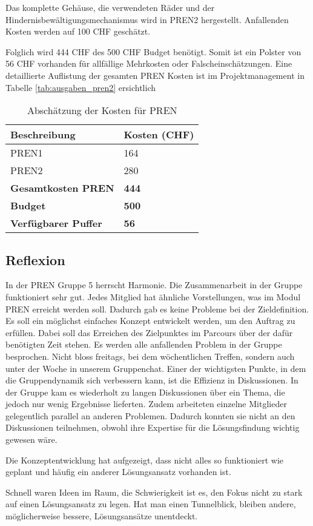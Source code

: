 \documentclass[../main.tex]{subfiles}
\begin{document}
Das komplette Gehäuse, die verwendeten Räder und der Hindernisbewältigungsmechanismus wird in PREN2 hergestellt. Anfallenden Kosten werden auf 100 CHF geschätzt.

Folglich wird 444 CHF des 500 CHF Budget benötigt. Somit ist ein Polster von 56 CHF vorhanden für allfällige Mehrkosten oder Falscheinschätzungen. Eine detaillierte Auflistung der gesamten PREN Kosten ist im Projektmanagement in Tabelle \ref{tab:ausgaben_pren2} ersichtlich

\begin{table}[h!]
    \centering
    \begin{tabular}{|p{5cm}|p{3cm}|}
        \hline
        \textbf{Beschreibung} & \textbf{Kosten (CHF)} \\
        \hline
        PREN1 & 164 \\
        \hline
        PREN2 & 280 \\
        \hline
        \textbf{Gesamtkosten PREN} & \textbf{444} \\
        \hline
        \textbf{Budget} & \textbf{500} \\
        \hline
        \textbf{Verfügbarer Puffer} & \textbf{56} \\
        \hline
    \end{tabular}
    \caption{Abschätzung der Kosten für PREN}
    \label{tab:kostenuebersicht}
\end{table}

\subsection{Reflexion}

In der PREN Gruppe 5 herrscht Harmonie.
\newline
\newline
Die Zusammenarbeit in der Gruppe funktioniert sehr gut. Jedes Mitglied hat ähnliche Vorstellungen, was im Modul PREN erreicht werden soll. Dadurch gab es keine Probleme bei der Zieldefinition. Es soll ein möglichst einfaches Konzept entwickelt werden, um den Auftrag zu erfüllen. Dabei soll das Erreichen des Zielpunktes im Parcours über der dafür benötigten Zeit stehen. Es werden alle anfallenden Problem in der Gruppe besprochen. Nicht bloss freitags, bei dem wöchentlichen Treffen, sondern auch unter der Woche in unserem Gruppenchat. Einer der wichtigsten Punkte, in dem die Gruppendynamik sich verbessern kann, ist die Effizienz in Diskussionen. In der Gruppe kam es wiederholt zu langen Diskussionen über ein Thema, die jedoch nur wenig Ergebnisse lieferten. Zudem arbeiteten einzelne Mitglieder gelegentlich parallel an anderen Problemen. Dadurch konnten sie nicht an den Diskussionen teilnehmen, obwohl ihre Expertise für die Lösungsfindung wichtig gewesen wäre.

Die Konzeptentwicklung hat aufgezeigt, dass nicht alles so funktioniert wie geplant und häufig ein anderer Lösungsansatz vorhanden ist. 

Schnell waren Ideen im Raum, die Schwierigkeit ist es, den Fokus nicht zu stark auf einen Lösungsansatz zu legen. Hat man einen Tunnelblick, bleiben andere, möglicherweise bessere, Lösungsansätze unentdeckt. 
\end{document}
